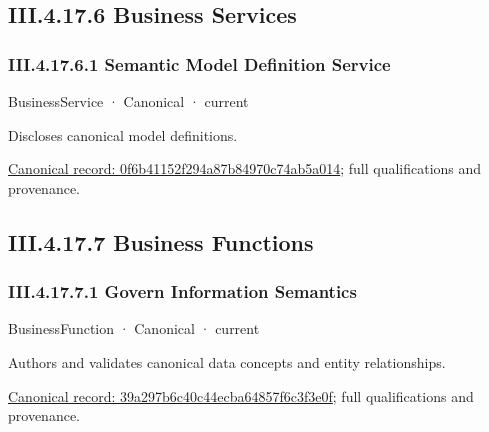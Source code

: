 \subsection*{III.4.17.6 Business Services}
\label{navigation:III.4.17.6}

\subsubsection*{III.4.17.6.1 Semantic Model Definition Service}
\label{navigation:III.4.17.6.1}

\label{element:0f6b41152f294a87b84970c74ab5a014}
{\small BusinessService · Canonical · current}\par

Discloses canonical model definitions.


{\footnotesize \href{../../../../../../../../continuum/business/business-service/0f6b41152f294a87b84970c74ab5a014.md}{Canonical record: 0f6b41152f294a87b84970c74ab5a014}; full qualifications and provenance.}\par
\subsection*{III.4.17.7 Business Functions}
\label{navigation:III.4.17.7}

\subsubsection*{III.4.17.7.1 Govern Information Semantics}
\label{navigation:III.4.17.7.1}

\label{element:39a297b6c40c44ecba64857f6c3f3e0f}
{\small BusinessFunction · Canonical · current}\par

Authors and validates canonical data concepts and entity relationships.


{\footnotesize \href{../../../../../../../../continuum/business/business-function/39a297b6c40c44ecba64857f6c3f3e0f.md}{Canonical record: 39a297b6c40c44ecba64857f6c3f3e0f}; full qualifications and provenance.}\par
